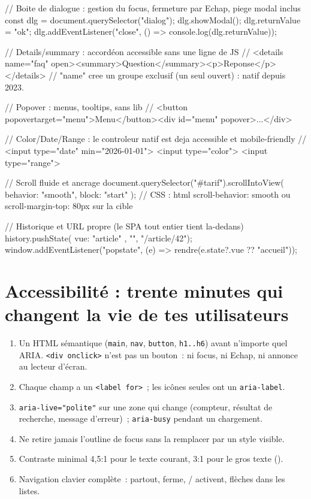 \begin{codejs}
// Boite de dialogue : gestion du focus, fermeture par Echap, piege modal inclus
const dlg = document.querySelector("dialog");
dlg.showModal();
dlg.returnValue = "ok";
dlg.addEventListener("close", () => console.log(dlg.returnValue));

// Details/summary : accord\'eon accessible sans une ligne de JS
// <details name="faq" open><summary>Question</summary><p>Reponse</p></details>
// "name" cree un groupe exclusif (un seul ouvert) : natif depuis 2023.

// Popover : menus, tooltips, sans lib
// <button popovertarget="menu">Menu</button><div id="menu" popover>...</div>

// Color/Date/Range : le controleur natif est deja accessible et mobile-friendly
// <input type="date" min="2026-01-01"> <input type="color"> <input type="range">

// Scroll fluide et ancrage
document.querySelector("#tarif").scrollIntoView({ behavior: "smooth", block: "start" });
// CSS : html { scroll-behavior: smooth }  ou  scroll-margin-top: 80px sur la cible

// Historique et URL propre (le SPA tout entier tient la-dedans)
history.pushState({ vue: "article" }, "", "/article/42");
window.addEventListener("popstate", (e) => rendre(e.state?.vue ?? "accueil"));
\end{codejs}

\section{Accessibilit\'e : trente minutes qui changent la vie de tes utilisateurs}

\begin{enumerate}
  \item Un HTML s\'emantique (\verb|main|, \verb|nav|, \verb|button|, \verb|h1..h6|) avant
        n'importe quel ARIA. \verb|<div onclick>| n'est pas un bouton~: ni focus, ni Echap,
        ni annonce au lecteur d'\'ecran.
  \item Chaque champ a un \verb|<label for>|~; les ic\^ones seules ont un \verb|aria-label|.
  \item \verb|aria-live="polite"| sur une zone qui change (compteur, r\'esultat de recherche,
        message d'erreur)~; \verb|aria-busy| pendant un chargement.
  \item Ne retire jamais l'outline de focus sans la remplacer par un style visible.
  \item Contraste minimal 4{,}5:1 pour le texte courant, 3:1 pour le gros texte
        ().
  \item Navigation clavier compl\`ete~:  partout,  ferme,
        / activent, fl\`eches dans les listes.
\end{enumerate}

